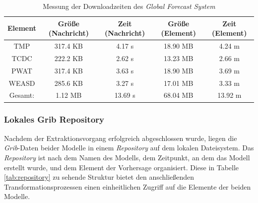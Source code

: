 \begin{table}[h]
  \centering
  {\sf
    \footnotesize
    \begin{longtable}{@{}ccccc}
      \toprule
      \textbf{Element} & \textbf{Größe (Nachricht)} & \textbf{Zeit (Nachricht)} & \textbf{Größe (Element)} & \textbf{Zeit (Element)} \\
      \midrule
      TMP   & 317.4 KB & 4.17 s & 18.90 MB & 4.24 m \\
      TCDC  & 222.2 KB & 2.62 s & 13.23 MB & 2.66 m \\
      PWAT  & 317.4 KB & 3.63 s & 18.90 MB & 3.69 m \\
      WEASD & 285.6 KB & 3.27 s & 17.01 MB & 3.33 m \\
      \midrule
      Gesamt: & 1.12 MB  & 13.69 s & 68.04 MB & 13.92 m \\
      \bottomrule
    \end{longtable}
  }
  \caption{Messung der Downloadzeiten des \textit{Global Forecast System}}
  \label{tab:download_messung_gfs}
\end{table}

\subsubsection{Lokales Grib Repository}
Nachdem der Extraktionsvorgang erfolgreich abgeschlossen wurde, liegen
die \textit{Grib}-Daten beider Modelle in einem \textit{Repository}
auf dem lokalen Dateisystem. Das \textit{Repository} ist nach dem
Namen des Modells, dem Zeitpunkt, an dem das Modell erstellt wurde,
und dem Element der Vorhersage organisiert. Diese in Tabelle
\ref{tab:repository} zu sehende Struktur bietet den anschließenden
Transformationsprozessen einen einheitlichen Zugriff auf die Elemente
der beiden Modelle.

